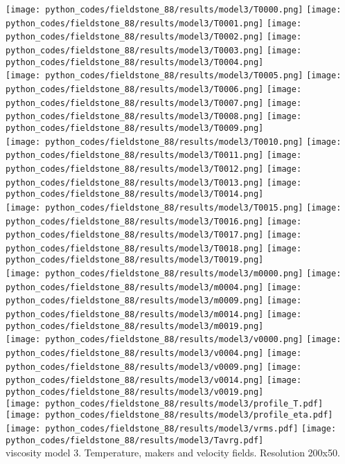 \begin{center}
\texttt{[image: python\_codes/fieldstone\_88/results/model3/T0000.png]}
\texttt{[image: python\_codes/fieldstone\_88/results/model3/T0001.png]}
\texttt{[image: python\_codes/fieldstone\_88/results/model3/T0002.png]}
\texttt{[image: python\_codes/fieldstone\_88/results/model3/T0003.png]}
\texttt{[image: python\_codes/fieldstone\_88/results/model3/T0004.png]}\\
\texttt{[image: python\_codes/fieldstone\_88/results/model3/T0005.png]}
\texttt{[image: python\_codes/fieldstone\_88/results/model3/T0006.png]}
\texttt{[image: python\_codes/fieldstone\_88/results/model3/T0007.png]}
\texttt{[image: python\_codes/fieldstone\_88/results/model3/T0008.png]}
\texttt{[image: python\_codes/fieldstone\_88/results/model3/T0009.png]}\\
\texttt{[image: python\_codes/fieldstone\_88/results/model3/T0010.png]}
\texttt{[image: python\_codes/fieldstone\_88/results/model3/T0011.png]}
\texttt{[image: python\_codes/fieldstone\_88/results/model3/T0012.png]}
\texttt{[image: python\_codes/fieldstone\_88/results/model3/T0013.png]}
\texttt{[image: python\_codes/fieldstone\_88/results/model3/T0014.png]}\\
\texttt{[image: python\_codes/fieldstone\_88/results/model3/T0015.png]}
\texttt{[image: python\_codes/fieldstone\_88/results/model3/T0016.png]}
\texttt{[image: python\_codes/fieldstone\_88/results/model3/T0017.png]}
\texttt{[image: python\_codes/fieldstone\_88/results/model3/T0018.png]}
\texttt{[image: python\_codes/fieldstone\_88/results/model3/T0019.png]}\\
\texttt{[image: python\_codes/fieldstone\_88/results/model3/m0000.png]}
\texttt{[image: python\_codes/fieldstone\_88/results/model3/m0004.png]}
\texttt{[image: python\_codes/fieldstone\_88/results/model3/m0009.png]}
\texttt{[image: python\_codes/fieldstone\_88/results/model3/m0014.png]}
\texttt{[image: python\_codes/fieldstone\_88/results/model3/m0019.png]}\\
\texttt{[image: python\_codes/fieldstone\_88/results/model3/v0000.png]}
\texttt{[image: python\_codes/fieldstone\_88/results/model3/v0004.png]}
\texttt{[image: python\_codes/fieldstone\_88/results/model3/v0009.png]}
\texttt{[image: python\_codes/fieldstone\_88/results/model3/v0014.png]}
\texttt{[image: python\_codes/fieldstone\_88/results/model3/v0019.png]}\\
\texttt{[image: python\_codes/fieldstone\_88/results/model3/profile\_T.pdf]}
\texttt{[image: python\_codes/fieldstone\_88/results/model3/profile\_eta.pdf]}
\texttt{[image: python\_codes/fieldstone\_88/results/model3/vrms.pdf]}
\texttt{[image: python\_codes/fieldstone\_88/results/model3/Tavrg.pdf]}\\
{\captionfont viscosity model 3. Temperature, makers and velocity fields. Resolution 200x50.}
\end{center} 

